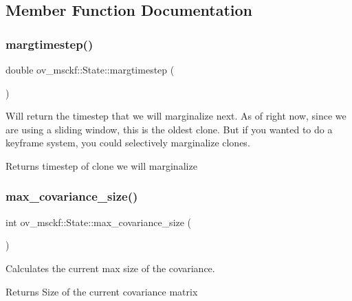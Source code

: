 \subsection{Member Function Documentation}
\mbox{\label{classov__msckf_1_1State_a36420e71ffa54625667eac2a8a345582}} 
\subsubsection{\texorpdfstring{margtimestep()}{margtimestep()}}
{\footnotesize\ttfamily double ov\+\_\+msckf\+::\+State\+::margtimestep (\begin{DoxyParamCaption}{ }\end{DoxyParamCaption})\hspace{0.3cm}{\ttfamily [inline]}}



Will return the timestep that we will marginalize next. As of right now, since we are using a sliding window, this is the oldest clone. But if you wanted to do a keyframe system, you could selectively marginalize clones. 

\begin{DoxyReturn}{Returns}
timestep of clone we will marginalize 
\end{DoxyReturn}
\mbox{\label{classov__msckf_1_1State_a37c45cc1d3d1a3dcc46d3799a997355f}} 
\subsubsection{\texorpdfstring{max\+\_\+covariance\+\_\+size()}{max\_covariance\_size()}}
{\footnotesize\ttfamily int ov\+\_\+msckf\+::\+State\+::max\+\_\+covariance\+\_\+size (\begin{DoxyParamCaption}{ }\end{DoxyParamCaption})\hspace{0.3cm}{\ttfamily [inline]}}



Calculates the current max size of the covariance. 

\begin{DoxyReturn}{Returns}
Size of the current covariance matrix 
\end{DoxyReturn}
